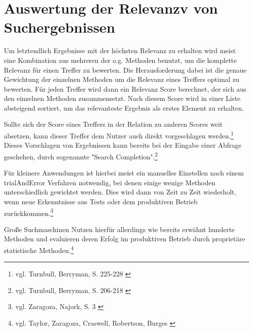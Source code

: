 \section{Auswertung der Relevanzv von Suchergebnissen}
\label{sec:relevanceScore}
Um letztendlich Ergebnisse mit der höchsten Relevanz zu erhalten wird meist eine Kombination aus mehreren der o.g. Methoden benutzt, um die komplette Relevanz für einen Treffer zu bewerten.
Die Herausforderung dabei ist die genaue Gewichtung der einzelnen Methoden um die Relevanz eines Treffers optimal zu bewerten.
Für jeden Treffer wird dann ein Relevanz Score berechnet, der sich aus den einzelnen Methoden zusammensetzt. Nach diesem Score wird in einer Liste absteigend sortiert, um das relevanteste Ergebnis als erstes Element zu erhalten.

Sollte sich der Score eines Treffers in der Relation zu anderen Scores weit absetzen, kann dieser Treffer dem Nutzer auch direkt vorgeschlagen werden.\footnote{vgl. Turnbull, Berryman, S. 225-228 \cite{turnbull2016}} Dieses Vorschlagen von Ergebnissen kann bereits bei der Eingabe einer Abfrage geschehen, durch sogenannte "Search Completion".\footnote{vgl. Turnbull, Berryman, S. 206-218 \cite{turnbull2016}}

Für kleinere Anwendungen ist hierbei meist ein manuelles Einstellen nach einem \gls{trialAndError} Verfahren notwendig, bei denen einige wenige Methoden unterschiedlich gewichtet werden.
Dies wird dann von Zeit zu Zeit wiederholt, wenn neue Erkenntnisse aus Tests oder dem produktiven Betrieb zurückkommen.\footnote{vgl. Zaragoza, Najork, S. 3 \cite{zaragoza2018}}

Große Suchmaschinen Nutzen hierfür allerdings wie bereits erwähnt hunderte Methoden und evaluieren deren Erfolg im produktiven Betrieb durch proprietäre statistische Methoden.\footnote{vgl. Taylor, Zaragoza, Craswell, Robertson, Burges \cite{taylor2006}}
